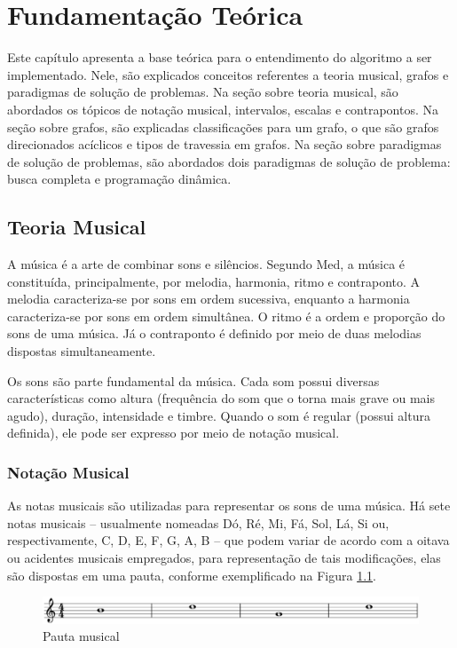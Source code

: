 \chapter[Fundamentação Teórica]{Fundamentação Teórica}

  Este capítulo apresenta a base teórica para o entendimento do algoritmo a ser implementado. Nele, são explicados conceitos referentes a teoria musical, grafos e paradigmas de solução de problemas. Na seção sobre teoria musical, são abordados os tópicos de notação musical, intervalos, escalas e contrapontos. Na seção sobre grafos, são explicadas classificações para um grafo, o que são grafos direcionados acíclicos e tipos de travessia em grafos. Na seção sobre paradigmas de solução de problemas, são abordados dois paradigmas de solução de problema: busca completa e programação dinâmica.

  \section[Teoria Musical]{Teoria Musical}

    A música é a arte de combinar sons e silêncios. Segundo Med, a música é constituída, principalmente, por melodia, harmonia, ritmo e contraponto. A melodia caracteriza-se por sons em ordem sucessiva, enquanto a harmonia caracteriza-se por sons em ordem simultânea. O ritmo é a ordem e proporção do sons de uma música. Já o contraponto é definido por meio de duas melodias dispostas simultaneamente.

    Os sons são parte fundamental da música. Cada som possui diversas características como altura (frequência do som que o torna mais grave ou mais agudo), duração, intensidade e timbre. Quando o som é regular (possui altura definida), ele pode ser expresso por meio de notação musical.

    \subsection[Notação Musical]{Notação Musical}

      As notas musicais são utilizadas para representar os sons de uma música. Há sete notas musicais -- usualmente nomeadas Dó, Ré, Mi, Fá, Sol, Lá, Si ou, respectivamente, C, D, E, F, G, A, B -- que podem variar de acordo com a oitava ou acidentes musicais empregados, para representação de tais modificações, elas são dispostas em uma pauta, conforme exemplificado na Figura \ref{pauta}.

      \begin{figure}[htb]
        \centering
        \includegraphics[scale=0.45]{figuras/pauta.eps}
        \caption{Pauta musical}
        \label{pauta}
      \end{figure}

